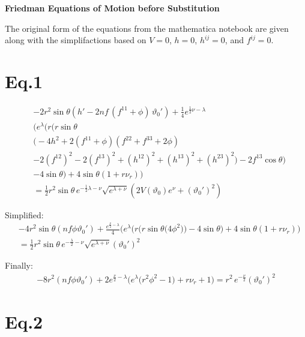 \documentclass[12pt]{article}
\begin{document}
\begin{center}
  \Large\textbf{Friedman Equations of Motion before Substitution} \\
  \large{}
\end{center}

The original form of the equations from the mathematica notebook are given along with the simplifactions based on $V=0$, $h=0$, $h^{ij}=0$, and $f^{ij}=0$.

\section*{Eq.1}

\begin{align*}
& -2r^2 \sin\theta \left( h' - 2nf \,(f^{11} + \phi)\, \vartheta_0' \right)
+\tfrac{1}{4} e^{\frac{1}{2}\nu - \lambda}
\\ &\Big(
 e^{\lambda} \big(
   r \big(
     r \sin\theta \\ &\big(
       -4h^2 
       + 2(f^{11} + \phi)(f^{22} + f^{33} + 2\phi) \\
       &- 2(f^{12})^2 - 2(f^{13})^2 
       + (h^{12})^2 + (h^{13})^2 + (h^{23})^2
     \big)
     - 2 f^{13} \cos\theta
   \big) \\
   &- 4\sin\theta
 \big)
 + 4\sin\theta \left(1 + r \nu_{r}\right)
\Big) \nonumber \\
&= \tfrac{1}{2} r^2 \sin\theta\, e^{-\frac{1}{2}\lambda - \nu}
  \sqrt{e^{\lambda + \nu}}
  \left( 2V(\vartheta_0)e^{\nu} + (\vartheta_0')^2 \right)
\end{align*}

Simplified:
\begin{align*}
& -4r^2 \sin\theta \left(nf\phi\vartheta_0' \right)
+\tfrac{e^{\frac{\nu}{2} - \lambda}}{4}
\Big(
 e^{\lambda} \big(
   r \big(
     r \sin\theta \big(
       4\phi^2\big)
   \big)
   - 4\sin\theta
 \big)
 + 4\sin\theta \left(1 + r \nu_{r}\right)
\Big) \\
&= \tfrac{1}{2} r^2 \sin\theta\, e^{-\frac{\lambda}{2} - \nu}
  \sqrt{e^{\lambda + \nu}} (\vartheta_0')^2
\end{align*}

Finally:
\begin{align*}
-8r^2 \left(nf\phi\vartheta_0' \right)
+2e^{\frac{\nu}{2} - \lambda}
\Big( e^{\lambda} \big(r^2\phi^2 - 1 \big) + r\nu_{r} + 1\Big)
= r^2 \, e^{-\frac{\nu}{2}}(\vartheta_0')^2
\end{align*}

\section*{Eq.2}
\end{document}
